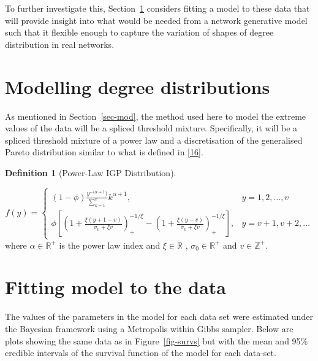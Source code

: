 \documentclass[
  10pt,
  a4paper,
]{scrreprt}
\theoremstyle{plain}
\theoremstyle{definition}
\newtheorem{definition}{Definition}[section]
\theoremstyle{plain}
\theoremstyle{remark}
\begin{document}
{To further investigate this, Section~\ref{sec-realmodel} considers
fitting a model to these data that will provide insight into what would
be needed from a network generative model such that it flexible enough
to capture the variation of shapes of degree distribution in real
networks.

\hypertarget{sec-realmodel}{%
\section{Modelling degree distributions}\label{sec-realmodel}}

As mentioned in Section~\ref{sec-mod}, the method used here to model the
extreme values of the data will be a spliced threshold mixture.
Specifically, it will be a spliced threshold mixture of a power law and
a discretisation of the generalised Pareto distribution similar to what
is defined in {[}\protect\hyperlink{ref-Rohrbeck_2018}{16}{]}.

\begin{definition}[Power-Law IGP
Distribution]\protect\hypertarget{def-pligp}{}\label{def-pligp}

\[
f(y) = \begin{cases}
(1-\phi)\displaystyle\frac{y^{-(\alpha+1})}{\sum_{k=1}^v}k^{\alpha+1}, & y=1,2,\ldots, v\\
\phi\left[\left(1+\displaystyle\frac{\xi(y+1-v)}{\sigma_0+\xi v}\right)_+^{-1/\xi}-\left(1+\displaystyle\frac{\xi(y-v)}{\sigma_0+\xi v}\right)_+^{-1/\xi}\right],&y=v+1, v+2,\ldots
\end{cases}
\] where \(\alpha\in\mathbb R^+\) is the power law index and
\(\xi \in \mathbb R\) , \(\sigma_0 \in \mathbb R^+\) and
\(v\in\mathbb Z^+.\)

\end{definition}

\hypertarget{fitting-model-to-the-data}{%
\section{Fitting model to the data}\label{fitting-model-to-the-data}}

The values of the parameters in the model for each data set were
estimated under the Bayesian framework using a Metropolis within Gibbs
sampler. Below are plots showing the same data as in
Figure~\ref{fig-survs} but with the mean and 95\% credible intervals of
the survival function of the model for each data-set.

\begin{figure}[H]


\end{figure}}
\end{document}
